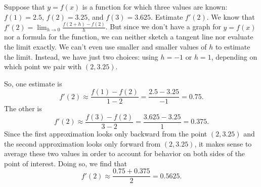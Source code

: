 \bex \label{Ex:1.5.1}
Suppose that $y = f(x)$ is a function for which three values are known:  $f(1) = 2.5$, $f(2) = 3.25$, and $f(3) = 3.625$.  Estimate $f'(2)$.
\eex
We know that $f'(2) = \lim_{h \to 0} \frac{f(2+h) - f(2)}{h}$.  But since we don't have a graph for $y = f(x)$ nor a formula for the function, we can neither sketch a tangent line nor evaluate the limit exactly.  We can't even use smaller and smaller values of $h$ to estimate the limit.  Instead, we have just two choices:  using $h = -1$ or $h = 1$, depending on which point we pair with $(2,3.25)$.

So, one estimate is
$$f'(2) \approx \frac{f(1)-f(2)}{1-2} = \frac{2.5-3.25}{-1} = 0.75.$$
The other is
$$f'(2) \approx \frac{f(3)-f(2)}{3-2} = \frac{3.625-3.25}{1} = 0.375.$$
Since the first approximation looks only backward from the point $(2,3.25)$ and the second approximation looks only forward from $(2,3.25)$, it makes sense to average these two values in order to account for behavior on both sides of the point of interest.  Doing so, we find that
$$f'(2) \approx \frac{0.75 + 0.375}{2} = 0.5625.$$
\afterex


